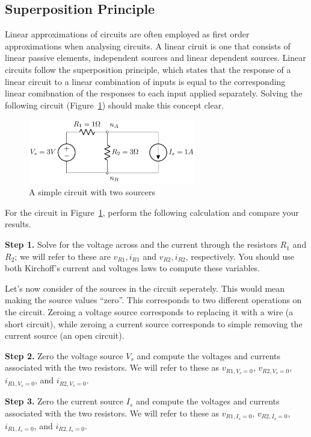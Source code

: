 \subsection{Superposition Principle}
Linear approximations of circuits are often employed as first order approximations when analysing circuits. A linear ciruit is one that consists of linear passive elements, independent sources and linear dependent sources. Linear circuits follow the superposition principle, which states that the response of a linear circuit to a linear combination of inputs is equal to the corresponding linear comibnation of the responses to each input applied separately. Solving the following circuit (Figure~\ref{fig:02-03}) should make this concept clear.
\begin{figure}[t]
    \centering
    \includegraphics[width=0.65\textwidth]{figure/fig02-03.pdf}
    \caption{A simple circuit with two sourcers}
    \label{fig:02-03}
\end{figure}
For the circuit in Figure~\ref{fig:02-03}, perform the following calculation and compare your results.

\noindent\textbf{Step 1.} Solve for the voltage across and the current through the resistors $R_1$ and $R_2$; we will refer to these are $v_{R1}, i_{R1}$ and $v_{R2}, i_{R2}$, respectively. You should use both Kirchoff's current and voltages laws to compute these variables.

\noindent Let's now consider of the sources in the circuit seperately. This would mean making the source values ``zero''. This corresponds to two different operations on the circuit. Zeroing a voltage source corresponds to replacing it with a wire (a short circuit), while zeroing a current source corresponds to simple removing the current source (an open circuit). 

\noindent\textbf{Step 2.} Zero the voltage source $V_s$ and compute the voltages and currents associated with the two resistors. We will refer to these as $v_{R1,V_s=0}$, $v_{R2,V_s=0}$, $i_{R1,V_s=0}$, and $i_{R2,V_s=0}$.

\noindent\textbf{Step 3.} Zero the current source $I_s$ and compute the voltages and currents associated with the two resistors. We will refer to these as $v_{R1,I_s=0}$, $v_{R2,I_s=0}$, $i_{R1,I_s=0}$, and $i_{R2,I_s=0}$.

